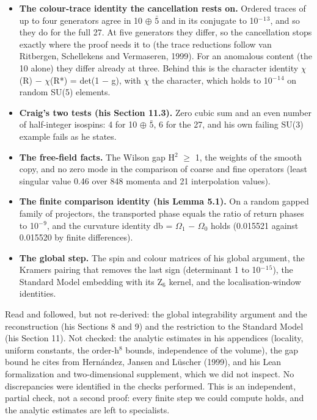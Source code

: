 \documentclass[
  11pt,
]{article}
\providecommand{\tightlist}{%
  \setlength{\itemsep}{0pt}\setlength{\parskip}{0pt}}
\begin{document}
\begin{itemize}
\tightlist
\item
  \textbf{The colour-trace identity the cancellation rests on.} Ordered traces of up to four generators agree in 10 \ensuremath{\oplus} \ensuremath{\bar{5}} and in its conjugate to 10\ensuremath{^{-}}\ensuremath{^{1}}\ensuremath{^{3}}, and so they do for the full 27. At five generators they differ, so the cancellation stops exactly where the proof needs it to (the trace reductions follow van Ritbergen, Schellekens and Vermaseren, 1999). For an anomalous content (the 10 alone) they differ already at three. Behind this is the character identity \ensuremath{\chi}(R) \ensuremath{-} \ensuremath{\chi}(R*) = det(1 \ensuremath{-} g), with \ensuremath{\chi} the character, which holds to 10\ensuremath{^{-}}\ensuremath{^{1}}\ensuremath{^{4}} on random SU(5) elements.
\item
  \textbf{Craig's two tests (his Section 11.3).} Zero cubic sum and an even number of half-integer isospins: 4 for 10 \ensuremath{\oplus} \ensuremath{\bar{5}}, 6 for the 27, and his own failing SU(3) example fails as he states.
\item
  \textbf{The free-field facts.} The Wilson gap H\ensuremath{^{2}} \ensuremath{\ge} 1, the weights of the smooth copy, and no zero mode in the comparison of coarse and fine operators (least singular value 0.46 over 848 momenta and 21 interpolation values).
\item
  \textbf{The finite comparison identity (his Lemma 5.1).} On a random gapped family of projectors, the transported phase equals the ratio of return phases to 10\ensuremath{^{-}}\ensuremath{^{9}}, and the curvature identity db = \ensuremath{\Omega}\ensuremath{_{1}} \ensuremath{-} \ensuremath{\Omega}\ensuremath{_{0}} holds (0.015521 against 0.015520 by finite differences).
\item
  \textbf{The global step.} The spin and colour matrices of his global argument, the Kramers pairing that removes the last sign (determinant 1 to 10\ensuremath{^{-}}\ensuremath{^{1}}\ensuremath{^{5}}), the Standard Model embedding with its Z\ensuremath{_{6}} kernel, and the localisation-window identities.
\end{itemize}

Read and followed, but not re-derived: the global integrability argument and the reconstruction (his Sections 8 and 9) and the restriction to the Standard Model (his Section 11). Not checked: the analytic estimates in his appendices (locality, uniform constants, the order-h\ensuremath{^{8}} bounds, independence of the volume), the gap bound he cites from Hernández, Jansen and Lüscher (1999), and his Lean formalization and two-dimensional supplement, which we did not inspect. No discrepancies were identified in the checks performed. This is an independent, partial check, not a second proof: every finite step we could compute holds, and the analytic estimates are left to specialists.
\end{document}
